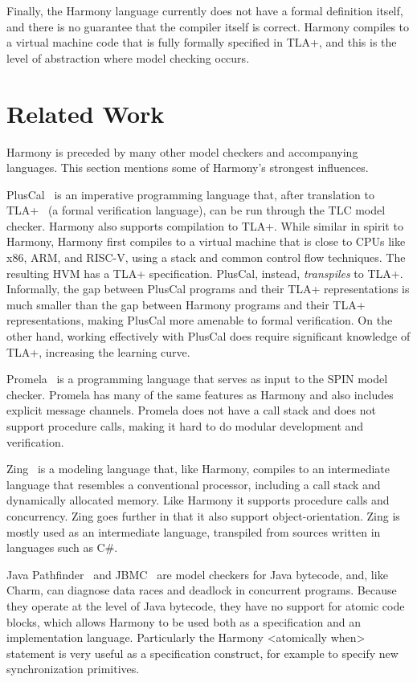 \documentclass[twocolumn]{article}
\begin{document}
Finally, the Harmony language currently does not have a formal definition
itself, and there is no guarantee that the compiler itself is correct.
Harmony compiles to a virtual machine code that is fully formally
specified in TLA+, and this is the level of abstraction where model
checking occurs.

\section{Related Work}

Harmony is preceded by many other model checkers and accompanying
languages.  This section mentions some of Harmony's strongest influences.

PlusCal~\cite{Lamport09} is an imperative programming language that,
after translation to TLA+~\cite{Lamport02} (a formal verification
language), can be run through the TLC model checker.  Harmony also
supports compilation to TLA+.  While similar in spirit to Harmony,
Harmony first compiles to a virtual machine that is close to CPUs
like x86, ARM, and RISC-V, using a stack and common control flow
techniques.  The resulting HVM has a TLA+ specification.  PlusCal,
instead, \emph{trans\-piles} to TLA+.  Informally, the gap between
PlusCal programs and their TLA+ representations is much smaller
than the gap between Harmony programs and their TLA+ representations,
making PlusCal more amenable to formal verification.  On the other
hand, working effectively with PlusCal does require significant
knowledge of TLA+, increasing the learning curve.

Promela~\cite{SPIN} is a programming language that serves as input
to the SPIN model checker.  Promela has many of the same features
as Harmony and also includes explicit message channels.  Promela
does not have a call stack and does not support procedure calls,
making it hard to do modular development and verification.

Zing~\cite{Zing} is a modeling language that, like Harmony, compiles to an
intermediate language that resembles a conventional processor,
including a call stack and dynamically allocated memory.  Like
Harmony it supports procedure calls and concurrency.  Zing goes
further in that it also support object-orientation.  Zing is
mostly used as an intermediate language, transpiled from sources
written in languages such as C\#.

Java Pathfinder~\cite{Pathfinder} and JBMC~\cite{JBMC} are model
checkers for Java bytecode, and,
like Charm, can diagnose data races and deadlock in concurrent
programs.  Because they operate at the level of Java bytecode, they
have no support for atomic code blocks, which allows Harmony to be
used both as a specification and an implementation language.
Particularly the Harmony <{atomically when}> statement is very
useful as a specification construct, for example to specify new
synchronization primitives.
\end{document}
